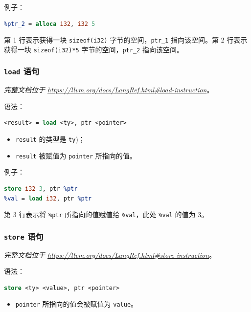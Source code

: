 例子：
\begin{lstlisting}[language=llvm]
%ptr_1 = alloca i32
%ptr_2 = alloca i32, i32 5
\end{lstlisting}

第 1 行表示获得一块 \texttt{sizeof(i32)} 字节的空间，\texttt{ptr\_1} 指向该空间。第 2
行表示获得一块 \texttt{sizeof(i32)*5} 字节的空间，\texttt{ptr\_2} 指向该空间。

\subsubsection{\texttt{load} 语句}\label{LLVM-load-statements}

\textit{完整文档位于 \url{https://llvm.org/docs/LangRef.html\#load-instruction}}。

语法：
\begin{lstlisting}[language=llvm]
<result> = load <ty>, ptr <pointer>
\end{lstlisting}

\begin{itemize}
  \item \texttt{result} 的类型是 \texttt{ty})；
  \item \texttt{result} 被赋值为 \texttt{pointer} 所指向的值。
\end{itemize}

例子：
\begin{lstlisting}[language=llvm]
%ptr = alloca i32
store i32 3, ptr %ptr
%val = load i32, ptr %ptr
\end{lstlisting}

第 3 行表示将 \texttt{\%ptr} 所指向的值赋值给 \texttt{\%val}，此处 \texttt{\%val}
的值为 3。

\subsubsection{\texttt{store} 语句}\label{LLVM-store-statements}

\textit{完整文档位于 \url{https://llvm.org/docs/LangRef.html\#store-instruction}}。

语法：
\begin{lstlisting}[language=llvm]
store <ty> <value>, ptr <pointer>
\end{lstlisting}

\begin{itemize}
  \item \texttt{pointer} 所指向的值会被赋值为 \texttt{value}。
\end{itemize}

